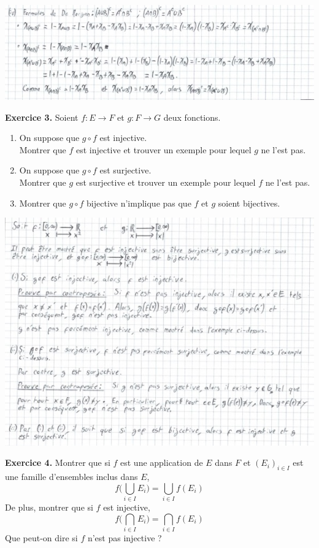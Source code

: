 \documentclass[a4paper, 10pt]{report}
\begin{document}
\begin{enumerate}[label=\arabic*.]
		\includegraphics{ex02-4.jpg}
	\end{enumerate}
		
	\vspace{5mm}
	\noindent
	\textbf{Exercice 3.} Soient $f : E \to F$ et $g : F \to G$ deux
	fonctions.
	\begin{enumerate}[label=\arabic*.]
		\item On suppose que $g \circ f$ est injective.\\
		Montrer que $f$ est injective et trouver un exemple pour
		lequel $g$ ne l'est pas.
		\item On suppose que $g \circ f$ est surjective.\\
		Montrer que $g$ est surjective et trouver un exemple pour
		lequel $f$ ne l'est pas.
		\item Montrer que $g \circ f$ bijective n'implique pas que
		$f$ et $g$ soient bijectives.
	\end{enumerate}
	
	\includegraphics{ex03.jpg}
	
	\newpage
	
	\noindent
	\textbf{Exercice 4.} Montrer que si $f$ est une application de $E$
	dans $F$ et $(E_i)_{i \in I}$ est une famille d'ensembles inclus
	dans $E$,
	\[f\Big(\bigcup\limits_{i \in I}E_i\Big)
			= \bigcup\limits_{i \in I}f(E_i)\]
	De plus, montrer que si $f$ est injective,
	\[f\Big(\bigcap\limits_{i \in I}E_i\Big)
			= \bigcap\limits_{i \in I}f(E_i)\]
	Que peut-on dire si $f$ n'est pas injective ?
	
\end{document}
